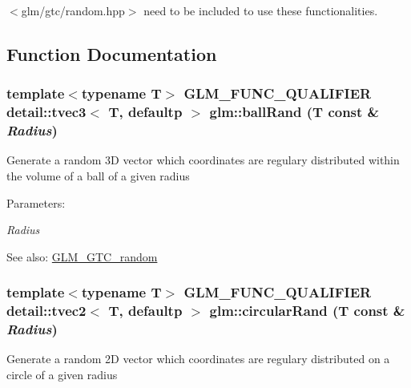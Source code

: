 $<$glm/gtc/random.hpp$>$ need to be included to use these functionalities. 

\subsection{Function Documentation}
\hypertarget{group__gtc__random_g8543dd05af529c33cb10deb832aab03a}{
\subsubsection[ballRand]{\setlength{\rightskip}{0pt plus 5cm}template$<$typename T$>$ GLM\_\-FUNC\_\-QUALIFIER detail::tvec3$<$ T, defaultp $>$ glm::ballRand (T const \& {\em Radius})}}
\label{group__gtc__random_g8543dd05af529c33cb10deb832aab03a}


Generate a random 3D vector which coordinates are regulary distributed within the volume of a ball of a given radius

\begin{Desc}
\item[Parameters:]
\begin{description}
\item[{\em Radius}]\end{description}
\end{Desc}
\begin{Desc}
\item[See also:]\hyperlink{group__gtc__random}{GLM\_\-GTC\_\-random} \end{Desc}
\hypertarget{group__gtc__random_gb633996dfedab1a7f45bb5cfa1b14443}{
\subsubsection[circularRand]{\setlength{\rightskip}{0pt plus 5cm}template$<$typename T$>$ GLM\_\-FUNC\_\-QUALIFIER detail::tvec2$<$ T, defaultp $>$ glm::circularRand (T const \& {\em Radius})}}
\label{group__gtc__random_gb633996dfedab1a7f45bb5cfa1b14443}


Generate a random 2D vector which coordinates are regulary distributed on a circle of a given radius

